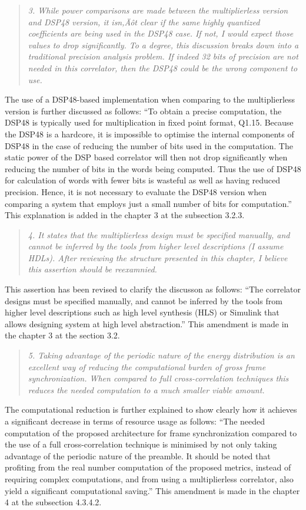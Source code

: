 \documentclass{article}
\begin{document}
\begin{quote}
\emph{3. While power comparisons are made between the multiplierless version and DSP48 version, it isn‚Äôt clear if the same highly quantized coefficients are being used in the DSP48 case. If not, I would expect those values to drop significantly. To a degree, this discussion breaks down into a traditional precision analysis problem. If indeed 32 bits of precision are not needed in this correlator, then the DSP48 could be the wrong component to use.}
\end{quote}
The use of a DSP48-based implementation when comparing to the multiplierless version is further discussed as follows:
``To obtain a precise computation, the DSP48 is typically used for multiplication in fixed point format, Q1.15. Because the DSP48 is a hardcore, it is impossible to optimise the internal components of DSP48 in the case of reducing the number of bits used in the computation. The static power of the DSP based correlator will then not drop significantly when reducing the number of bits in the words being computed. Thus the use of DSP48 for calculation of words with fewer bits is wasteful as well as having reduced precision. Hence, it is not necessary to evaluate the DSP48 version when comparing a system that employs just a small number of  bits for computation.''
This explanation is added in the chapter 3 at the subsection 3.2.3.

\begin{quote}
\emph{4. It states that the multiplierless design must be specified manually, and cannot be inferred by the tools from higher level descriptions (I assume HDLs). After reviewing the structure presented in this chapter, I believe this assertion should be reexamnied.}
\end{quote}
This assertion has been revised to clarify the discusson as follows:
``The correlator designs must be specified manually, and cannot be inferred by the tools from higher level descriptions such as high level synthesis (HLS) or Simulink that allows designing system at high level abstraction.''
This amendment is made in the chapter 3 at the section 3.2.

\begin{quote}
\emph{5. Taking advantage of the periodic nature of the energy distribution is an excellent way of reducing the computational burden of gross frame synchronization. When compared to full cross-correlation techniques this reduces the needed computation to a much smaller viable amount.}
\end{quote}
The computational reduction is further explained to show clearly how it achieves a significant decrease in terms of resource usage as follows: 
``The needed computation of the proposed architecture for frame synchronization compared to the use of a full cross-correlation technique is minimised by not only taking advantage of the periodic nature of the preamble. 
It should be noted that profiting from the real number computation of the proposed metrics, instead of requiring complex computations, and from using a multiplierless correlator, also yield a significant computational saving.''
This amendment is made in the chapter 4 at the subsection 4.3.4.2.
\end{document}
